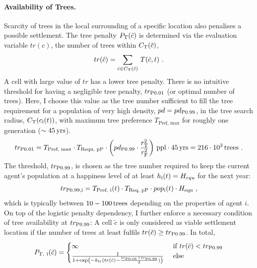 \paragraph{Availability of Trees.} %
Scarcity of trees in the local surrounding of a specific location also penalises a possible settlement.
The tree penalty $P_{\rm T}(\tilde{c})$ is determined via the evaluation variable $tr(c)$, the number of trees within $C_{\rm T}(\tilde{c})$,
\begin{equation}
	tr(\hat{c}) = \sum_{\hat{c} \in C_{\rm T}(\tilde{c})}\, T(\tilde{c},t) \ .
\end{equation}
A cell with large value of $tr$ has a lower tree penalty.
There is no intuitive threshold for having a negligible tree penalty, $tr_{\rm P0.01}$ (or optimal number of trees).
Here, I choose this value as the tree number sufficient to fill the tree requirement for a population of very high density, $pd = pd_{\rm P0.99}$, in the tree search radius, $C_{\rm T}(c_{\rm i}(t))$, with maximum tree preference $T_\text{Pref, max}$ for roughly one generation ($\sim 45\, {\rm yrs}$).
\begin{equation}
tr_{\rm P0.01} = T_\text{Pref, max} \cdot T_\text{Requ, pP} \cdot \left(pd_{\rm P0.99} \cdot \frac{r_{\rm T}^2}{r_{\rm F}^{2}}\right) \, {\rm ppl} \cdot 45\, {\rm yrs} = 
216\cdot 10^3 \, {\rm trees} \ .
\end{equation} 
The threshold, $tr_{\rm P0.99}$, is chosen as the tree number required to keep the current agent's population at a happiness level of at least $h_{\rm i}(t) = H_{equ}$ for the next year:
\begin{equation}
tr_{\rm P0.99, i}= T_\text{Pref, i}(t) \cdot T_\text{Req, pP} \cdot pop_{\rm i}(t) \cdot H_\text{equ} \ ,
\end{equation}
which is typically between $10-100\, {\rm trees}$ depending on the properties of agent $i$.
On top of the logistic penalty dependency, I further enforce a necessary condition of tree availability at $tr_{\rm P0.99}$: 
A cell $\tilde{c}$ is only considered as viable settlement location if the number of trees at least fulfils $tr(\tilde{c}) \geq tr_{\rm P0.99}$. 
In total, 
\begin{equation}
P_{\rm T, \ i}(\tilde{c}) = 
\begin{cases} \infty & \text{ if }tr(\tilde{c})< tr_{\rm P0.99} \\
\frac{1}{1+\exp\left( - k_{\rm tr} (tr(\tilde{c})-\frac{tr_{\rm P0.01}+tr_{\rm P0.99}}{2}) \right)} & \text{ else }
\end{cases}
\end{equation}


